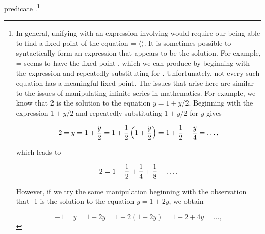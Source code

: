 predicate .\footnote{In general, unifying  with an
expression involving  would require our being able to find a fixed
point of the equation  = \( \langle \)\( \rangle \).  It
is sometimes possible to syntactically form an expression that appears to be
the solution.  For example,  =  seems to have the fixed
point , which we can produce by beginning with the
expression  and repeatedly substituting  for
.  Unfortunately, not every such equation has a meaningful fixed
point.  The issues that arise here are similar to the issues of manipulating
infinite series in mathematics.  For example, we know that 2 is the solution to
the equation \( y = 1 + y / 2 \).  Beginning with the expression \( 1 + y / 2 \)
and repeatedly substituting \( 1 + y / 2 \) for \( y \) gives
\begin{comment}

\begin{example}
2 = y = 1 + y/2 = 1 + (1 + y/2)/2 = 1 + 1/2 + y/4 = ...
\end{example}

\end{comment}

$$ 2 = y = 1 + {y \over 2} = 1 + {1\over2}\left(1 + {y \over 2}\right) =
	1 + {1\over2} + {y \over 4} = \dots , $$

\noindent
which leads to
\begin{comment}

\begin{example}
2 = 1 + 1/2 + 1/4 + 1/8 + ...
\end{example}

\end{comment}

$$ 2 = 1 + {1\over2} + {1\over4} + {1\over8} + \dots. $$

\noindent
However, if we try the same manipulation beginning with the observation that -1
is the solution to the equation \( y = 1 + 2y \), we obtain
\begin{comment}

\begin{example}
-1 = y = 1 + 2y = 1 + 2(1 + 2y) = 1 + 2 + 4y = ...
\end{example}

\end{comment}

$$ -1 = y = 1 + 2y = 1 + 2(1 + 2y) = 1 + 2 + 4y = \dots, $$

}
